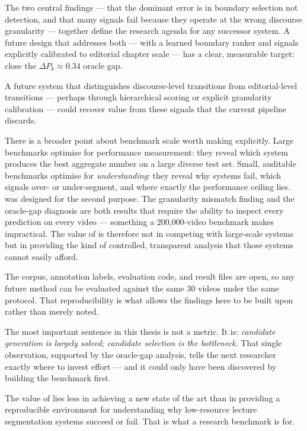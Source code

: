 The two central findings --- that the dominant error is in boundary selection
not detection, and that many signals fail because they operate at the wrong
discourse granularity --- together define the research agenda for any
successor system.
A future design that addresses both --- with a learned boundary ranker and
signals explicitly calibrated to editorial chapter scale --- has a clear,
measurable target: close the $\Delta P_k \approx 0.34$ oracle gap.

A future system that distinguishes discourse-level transitions from
editorial-level transitions --- perhaps through hierarchical scoring or
explicit granularity calibration --- could recover value from these signals
that the current pipeline discards.

There is a broader point about benchmark scale worth making explicitly.
Large benchmarks optimise for performance measurement: they reveal which
system produces the best aggregate number on a large diverse test set.
Small, auditable benchmarks optimise for \emph{understanding}: they reveal
why systems fail, which signals over- or under-segment, and where exactly
the performance ceiling lies.
\dataset{} was designed for the second purpose.
The granularity mismatch finding and the oracle-gap diagnosis are both results
that require the ability to inspect every prediction on every video --- something
a 200,000-video benchmark makes impractical.
The value of \lecseg{} is therefore not in competing with large-scale systems
but in providing the kind of controlled, transparent analysis that those systems
cannot easily afford.

The \dataset{} corpus, annotation labels, evaluation code, and result files
are open, so any future method can be evaluated against the same 30 videos
under the same protocol.
That reproducibility is what allows the findings here to be built upon rather
than merely noted.

The most important sentence in this thesis is not a metric.
It is: \emph{candidate generation is largely solved; candidate selection is the
bottleneck.}
That single observation, supported by the oracle-gap analysis, tells the next
researcher exactly where to invest effort --- and it could only have been
discovered by building the benchmark first.

The value of \lecseg{} lies less in achieving a new state of the art than in
providing a reproducible environment for understanding why low-resource lecture
segmentation systems succeed or fail.
That is what a research benchmark is for.
